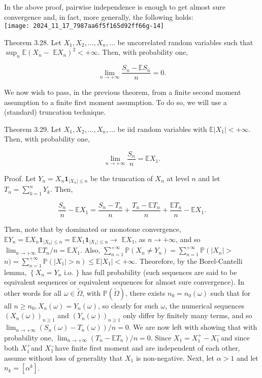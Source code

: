 \documentclass[11pt]{amsbook}
\theoremstyle{plain}%
\theoremstyle{definition}
\theoremstyle{remark}
\begin{document}
In the above proof, pairwise independence is enough to get almost sure convergence and, in fact, more generally, the following holds:\\
\texttt{[image: 2024\_11\_17\_7987aa6f5f165d92ff66g-14]}

Theorem 3.28. Let $X_{1}, X_{2}, \ldots, X_{n}, \ldots$ be uncorrelated random variables such that $\sup _{n} \mathbb{E}\left(X_{n}-\right.$ $\left.\mathbb{E} X_{n}\right)^{2}<+\infty$. Then, with probability one,

$$
\lim _{n \rightarrow+\infty} \frac{S_{n}-\mathbb{E} S_{n}}{n}=0 .
$$

We now wish to pass, in the previous theorem, from a finite second moment assumption to a finite first moment assumption. To do so, we will use a (standard) truncation technique.

Theorem 3.29. Let $X_{1}, X_{2}, \ldots, X_{n}, \ldots$ be iid random variables with $\mathbb{E}\left|X_{1}\right|<+\infty$. Then, with probability one,

$$
\lim _{n \rightarrow+\infty} \frac{S_{n}}{n}=\mathbb{E} X_{1} .
$$

Proof. Let $Y_{n}=X_{n} \mathbf{1}_{\left|X_{n}\right| \leq n}$ be the truncation of $X_{n}$ at level $n$ and let $T_{n}=\sum_{k=1}^{n} Y_{k}$. Then,

$$
\frac{S_{n}}{n}-\mathbb{E} X_{1}=\frac{S_{n}-T_{n}}{n}+\frac{T_{n}-\mathbb{E} T_{n}}{n}+\frac{\mathbb{E} T_{n}}{n}-\mathbb{E} X_{1} .
$$

Then, note that by dominated or monotone convergence, $\mathbb{E} Y_{n}=\mathbb{E} X_{n} \mathbf{1}_{\left|X_{n}\right| \leq n}=\mathbb{E} X_{1} \mathbf{1}_{\left|X_{1}\right| \leq n} \rightarrow$ $\mathbb{E} X_{1}$, as $n \rightarrow+\infty$, and so $\lim _{n \rightarrow+\infty} \mathbb{E} T_{n} / n=\mathbb{E} X_{1}$. Also, $\sum_{n=1}^{+\infty} \mathbb{P}\left(X_{n} \neq Y_{n}\right)=\sum_{n=1}^{+\infty} \mathbb{P}\left(\left|X_{n}\right|>\right.$ $n)=\sum_{n=1}^{+\infty} \mathbb{P}\left(\left|X_{1}\right|>n\right) \leq \mathbb{E}\left|X_{1}\right|<+\infty$. Theorefore, by the Borel-Cantelli lemma, $\left\{X_{n}=Y_{n}\right.$ i.o. $\}$ has full probability (such sequences are said to be equivalent sequences or equivalent sequences for almost sure convergence). In other words for all $\omega \in \widetilde{\Omega}$, with $\mathbb{P}(\widetilde{\Omega})$, there exists $n_{0}=n_{0}(\omega)$ such that for all $n \geq n_{0}, X_{n}(\omega)=Y_{n}(\omega)$, so clearly for such $\omega$, the numerical sequences $\left(X_{n}(\omega)\right)_{n \geq 1}$ and $\left(Y_{n}(\omega)\right)_{n \geq 1}$ only differ by finitely many terms, and so $\lim _{n \rightarrow+\infty}\left(S_{n}(\omega)-T_{n}(\omega)\right) / n=0$. We are now left with showing that with probability one, $\lim _{n \rightarrow+\infty}\left(T_{n}-\mathbb{E} T_{n}\right) / n=0$. Since $X_{1}=X_{1}^{+}-X_{1}^{-}$and since both $X_{1}^{+}$and $X_{1}^{-}$have finite first moment and are independent of each other, assume without loss of generality that $X_{1}$ is non-negative. Next, let $\alpha>1$ and let $n_{k}=\left[\alpha^{k}\right]$.
\end{document}
